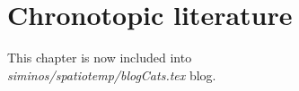
\chapter{Chronotopic literature}
\label{chap:chronotopeNo}

\begin{description}
     {
This chapter is now included into \\
\emph{siminos/spatiotemp/blogCats.tex} blog.
    }
\end{description}
